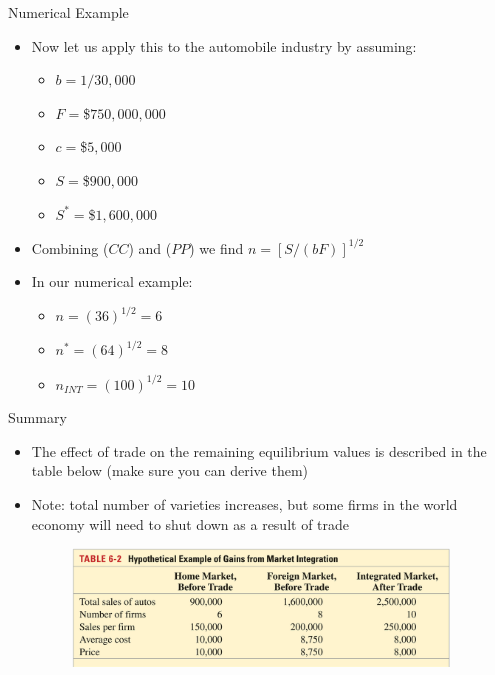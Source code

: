 \documentclass[10pt,hyperref={CJKbookmarks=true},xcolor=dvipsnames,aspectratio=169]{beamer}
\begin{document}
\begin{frame}{Numerical Example }

\begin{itemize}
\item Now let us apply this to the automobile industry by assuming: 

\begin{itemize}
\item $b=1/30,000$
\item $F=$\$$750,000,000$
\item $c=$\$$5,000$
\item $S=$\$$900,000$
\item $S^{*}=$\$$1,600,000$
\end{itemize}
\item Combining ($CC$) and ($PP$) we find $n=[S/(bF)]^{1/2}$
\item In our numerical example: 

\begin{itemize}
\item $n=(36)^{1/2}=6$
\item $n^{*}=(64)^{1/2}=8$
\item $n_{INT}=(100)^{1/2}=10$
\end{itemize}
\end{itemize}
\end{frame}

\begin{frame}{Summary }

\begin{itemize}
\item The effect of trade on the remaining equilibrium values is described
in the table below (make sure you can derive them) 
\item Note: total number of varieties increases, but some firms in the world
economy will need to shut down as a result of trade
\begin{figure}
\centering{}\includegraphics[width=10cm]{fig/krugman/lec6-17}
\end{figure}

\end{itemize}
\end{frame}
\end{document}
